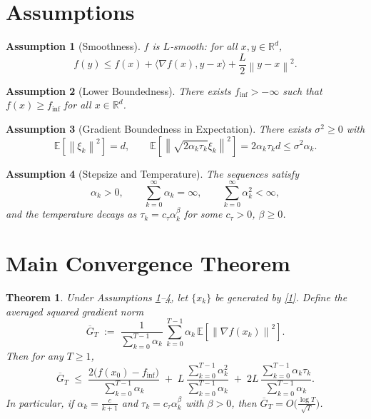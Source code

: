 \documentclass{article}
\newtheorem{theorem}{Theorem}
\newtheorem{assumption}{Assumption}
\newcommand{\E}{\mathbb{E}}
\newcommand{\R}{\mathbb{R}}
\newcommand{\norm}[1]{\left\|#1\right\|}
\newcommand{\iprod}[2]{\langle #1,#2\rangle}
\begin{document}
\newpage

\section*{Assumptions}
\begin{assumption}[Smoothness]\label{ass:smooth}
$f$ is $L$‑smooth: for all $x,y\in\R^{d}$,
\[
f(y)\le f(x)+\iprod{\nabla f(x)}{y-x}+\frac{L}{2}\norm{y-x}^{2}.
\tag{A1}
\]
\end{assumption}
\begin{assumption}[Lower Boundedness]\label{ass:lb}
There exists $f_{\inf}>-\infty$ such that $f(x)\ge f_{\inf}$ for all $x\in\R^{d}$.
\end{assumption}
\begin{assumption}[Gradient Boundedness in Expectation]\label{ass:gradvar}
There exists $\sigma^{2}\ge0$ with
\[
\E\!\left[\norm{\xi_{k}}^{2}\right]=d,\qquad
\E\!\left[\norm{\sqrt{2\alpha_{k}\tau_{k}}\xi_{k}}^{2}\right]=2\alpha_{k}\tau_{k}d\le\sigma^{2}\alpha_{k}.
\tag{A3}
\]
\end{assumption}
\begin{assumption}[Stepsize and Temperature]\label{ass:step}
The sequences satisfy
\[
\alpha_{k}>0,\qquad \sum_{k=0}^{\infty}\alpha_{k}= \infty,\qquad
\sum_{k=0}^{\infty}\alpha_{k}^{2}<\infty,
\]
and the temperature decays as $\tau_{k}=c_{\tau}\alpha_{k}^{\beta}$ for some
$c_{\tau}>0$, $\beta\ge0$.
\end{assumption}

\section*{Main Convergence Theorem}
\begin{theorem}\label{thm:main}
Under Assumptions \ref{ass:smooth}–\ref{ass:step}, let $\{x_{k}\}$ be generated by
\eqref{1}. Define the averaged squared gradient norm
\[
\overline{G}_{T}\;:=\;\frac{1}{\sum_{k=0}^{T-1}\alpha_{k}}\,
\sum_{k=0}^{T-1}\alpha_{k}\,\E\!\left[\norm{\nabla f(x_{k})}^{2}\right].
\]
Then for any $T\ge1$,
\[
\boxed{
\overline{G}_{T}\;\le\;
\frac{2\bigl(f(x_{0})-f_{\inf}\bigr)}{\sum_{k=0}^{T-1}\alpha_{k}}
\;+\;
L\,\frac{\sum_{k=0}^{T-1}\alpha_{k}^{2}}{\sum_{k=0}^{T-1}\alpha_{k}}
\;+\;
2L\,\frac{\sum_{k=0}^{T-1}\alpha_{k}\tau_{k}}{\sum_{k=0}^{T-1}\alpha_{k}}.
}
\tag{2}
\]
In particular, if $\alpha_{k}= \frac{c}{k+1}$ and $\tau_{k}=c_{\tau}\alpha_{k}^{\beta}$ with
$\beta>0$, then $\overline{G}_{T}=O\!\bigl(\frac{\log T}{\sqrt{T}}\bigr)$.
\end{theorem}
\end{document}

